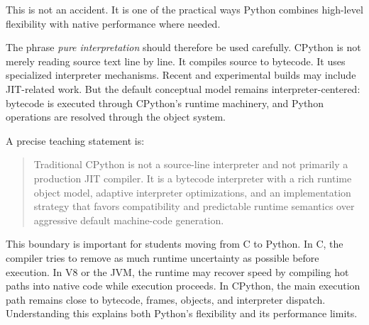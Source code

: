 This is not an accident. It is one of the practical ways Python combines high-level flexibility with native performance where needed.

The phrase \emph{pure interpretation} should therefore be used carefully. CPython is not merely reading source text line by line. It compiles source to bytecode. It uses specialized interpreter mechanisms. Recent and experimental builds may include JIT-related work. But the default conceptual model remains interpreter-centered: bytecode is executed through CPython's runtime machinery, and Python operations are resolved through the object system.

A precise teaching statement is:

\begin{quote}
Traditional CPython is not a source-line interpreter and not primarily a production JIT compiler. It is a bytecode interpreter with a rich runtime object model, adaptive interpreter optimizations, and an implementation strategy that favors compatibility and predictable runtime semantics over aggressive default machine-code generation.
\end{quote}

This boundary is important for students moving from C to Python. In C, the compiler tries to remove as much runtime uncertainty as possible before execution. In V8 or the JVM, the runtime may recover speed by compiling hot paths into native code while execution proceeds. In CPython, the main execution path remains close to bytecode, frames, objects, and interpreter dispatch. Understanding this explains both Python's flexibility and its performance limits.